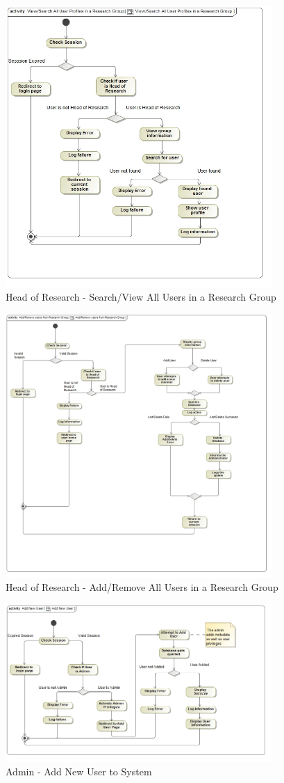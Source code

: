 \documentclass{article}
\begin{document}
			\begin{figure}[H]
				\includegraphics[width=4in, center]{../Diagrams/Process Specifications/View_Search All User Profiles in a Research Group.jpg}
				\caption{Head of Research - Search/View All Users in a Research Group}
			\end{figure}
			\begin{figure}[H]
				\includegraphics[width=4in, center]{../Diagrams/Process Specifications/Add_Remove Users from Research Group.jpg}
				\caption{Head of Research - Add/Remove All Users in a Research Group}
			\end{figure}
			\begin{figure}[H]
				\includegraphics[width=4in, center]{../Diagrams/Process Specifications/Add New User.jpg}
				\caption{Admin - Add New User to System}
			\end{figure}
\end{document}
